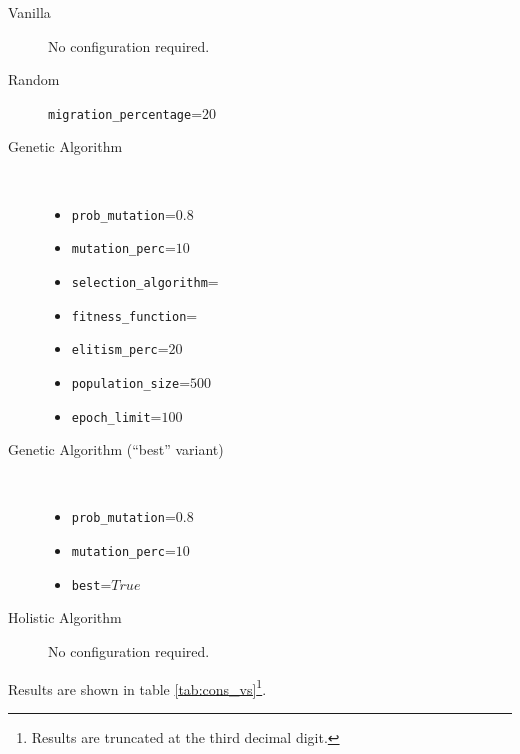 \begin{description}
  \item[Vanilla] No configuration required.
  \item[Random] \texttt{migration\_percentage}=$20$
  \item[Genetic Algorithm] \hfill \\
    \begin{itemize}
      \item \texttt{prob\_mutation}=$0.8$
      \item \texttt{mutation\_perc}=$10$
      \item \texttt{selection\_algorithm}=\hfill \\ 
      \item \texttt{fitness\_function}=\hfill \\ 
      \item \texttt{elitism\_perc}=$20$
      \item \texttt{population\_size}=$500$
      \item \texttt{epoch\_limit}=$100$
    \end{itemize}
  \item[Genetic Algorithm (``best'' variant)] \hfill \\
    \begin{itemize}
      \item \texttt{prob\_mutation}=$0.8$
      \item \texttt{mutation\_perc}=$10$
      \item \texttt{best}=$True$
    \end{itemize}
  \item[Holistic Algorithm] No configuration required.
\end{description}

Results are shown in table \ref{tab:cons_vs}\footnote{Results are truncated at the third decimal digit.}.

